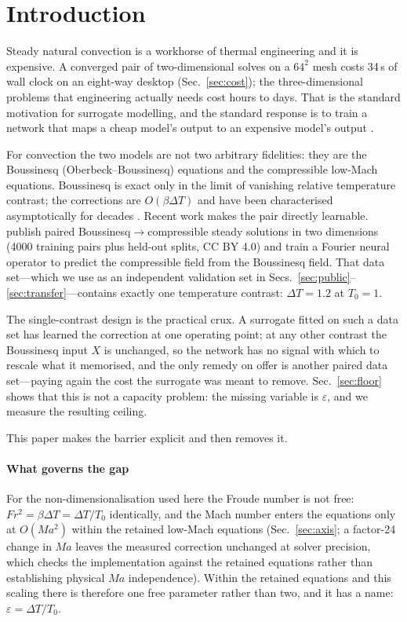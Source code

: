 \documentclass[preprint,11pt,a4paper,times,doubleblind]{elsarticle}
\begin{document}
\section{Introduction}
\label{sec:intro}

Steady natural convection is a workhorse of thermal engineering and it is expensive. A converged
pair of two-dimensional solves on a $64^2$ mesh costs 34\,s of wall clock on an eight-way desktop
(Sec.~\ref{sec:cost}); the three-dimensional problems that engineering actually needs cost hours to
days. That is the standard motivation for surrogate modelling, and the standard response is to
train a network that maps a cheap model's output to an expensive model's output
\citep{giacomini2026surrogates,meng2025physics}.

For convection the two models are not two arbitrary fidelities: they are the Boussinesq
(Oberbeck--Boussinesq) equations and the compressible low-Mach equations. Boussinesq is exact only
in the limit of vanishing relative temperature contrast; the corrections are $O(\beta\Delta T)$ and
have been characterised asymptotically for decades \citep{spiegel1960boussinesq,gray1976validity}.
Recent work makes the pair directly learnable. \citet{menglik2026neural} publish paired
Boussinesq$\to$compressible steady solutions in two dimensions (4000 training pairs plus held-out
splits, CC BY 4.0) and train a Fourier neural operator \citep{li2021fourier} to predict the
compressible field from the Boussinesq field. That data set---which we use as an independent
validation set in Secs.~\ref{sec:public}--\ref{sec:transfer}---contains exactly one
temperature contrast: $\Delta T=1.2$ at $T_0=1$.

The single-contrast design is the practical crux. A surrogate fitted on such a data set
has learned the correction at one operating point; at any other contrast the Boussinesq input $X$
is unchanged, so the network has no signal with which to rescale what it memorised, and the only
remedy on offer is another paired data set---paying again the cost the surrogate was meant to
remove. Sec.~\ref{sec:floor} shows that this is not a capacity problem: the missing variable is
$\varepsilon$, and we measure the resulting ceiling.

This paper makes the barrier explicit and then removes it.

\paragraph{What governs the gap} For the non-dimensionalisation used here the Froude number is not
free: $Fr^2=\beta\Delta T=\Delta T/T_0$ identically, and the Mach number enters the equations only
at $O(Ma^2)$ within the retained low-Mach equations (Sec.~\ref{sec:axis}; a factor-24 change in
$Ma$ leaves the measured correction unchanged at solver precision, which checks the implementation against the retained equations rather 
than establishing physical $Ma$ independence). Within the
retained equations and this scaling there is therefore one free parameter rather than two, and it
has a name: $\varepsilon=\Delta T/T_0$.
\end{document}
